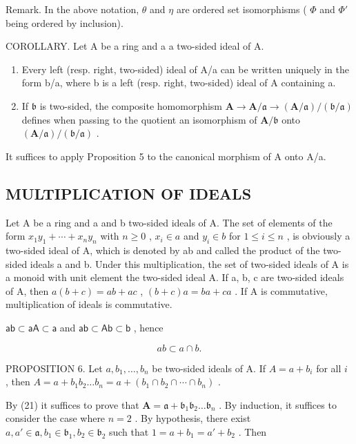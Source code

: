 Remark. In the above notation, \(\theta\) and \(\eta\) are ordered set isomorphisms ( \(\Phi\) and \(\Phi'\) being ordered by inclusion).

COROLLARY. Let A be a ring and a a two-sided ideal of A.

\begin{enumerate}
\def\labelenumi{(\alph{enumi})}
\item
  Every left (resp. right, two-sided) ideal of A/a can be written uniquely in the form b/a, where b is a left (resp. right, two-sided) ideal of A containing a.
\item
  If \(\mathfrak{b}\) is two-sided, the composite homomorphism \(\mathbf{A} \to \mathbf{A} / \mathfrak{a} \to (\mathbf{A} / \mathfrak{a}) / (\mathfrak{b} / \mathfrak{a})\) defines when passing to the quotient an isomorphism of \(\mathbf{A} / \mathfrak{b}\) onto \((\mathbf{A} / \mathfrak{a}) / (\mathfrak{b} / \mathfrak{a})\) .
\end{enumerate}

It suffices to apply Proposition 5 to the canonical morphism of A onto A/a.

\subsection{MULTIPLICATION OF IDEALS}

Let A be a ring and a and b two-sided ideals of A. The set of elements of the form \(x_{1}y_{1} + \cdots + x_{n}y_{n}\) with \(n \geqslant 0\) , \(x_{i} \in a\) and \(y_{i} \in b\) for \(1 \leqslant i \leqslant n\) , is obviously a two-sided ideal of A, which is denoted by ab and called the product of the two-sided ideals a and b. Under this multiplication, the set of two-sided ideals of A is a monoid with unit element the two-sided ideal A. If a, b, c are two-sided ideals of A, then \(a(b + c) = ab + ac\) , \((b + c)a = ba + ca\) . If A is commutative, multiplication of ideals is commutative.

\(\mathsf{ab}\subset \mathsf{aA}\subset \mathsf{a}\) and \(\mathsf{ab}\subset \mathsf{Ab}\subset \mathsf{b}\) , hence

\[
a b \subset a \cap b.\tag{21}
\]

PROPOSITION 6. Let \(a, b_{1}, \ldots, b_{n}\) be two-sided ideals of A. If \(A = a + b_{i}\) for all \(i\) , then \(A = a + b_{1}b_{2} \ldots b_{n} = a + (b_{1} \cap b_{2} \cap \cdots \cap b_{n})\) .

By (21) it suffices to prove that \(\mathbf{A} = \mathfrak{a} + \mathfrak{b}_1\mathfrak{b}_2\ldots \mathfrak{b}_n\) . By induction, it suffices to consider the case where \(n = 2\) . By hypothesis, there exist \(a, a' \in \mathfrak{a}, b_1 \in \mathfrak{b}_1, b_2 \in \mathfrak{b}_2\) such that \(1 = a + b_1 = a' + b_2\) . Then

